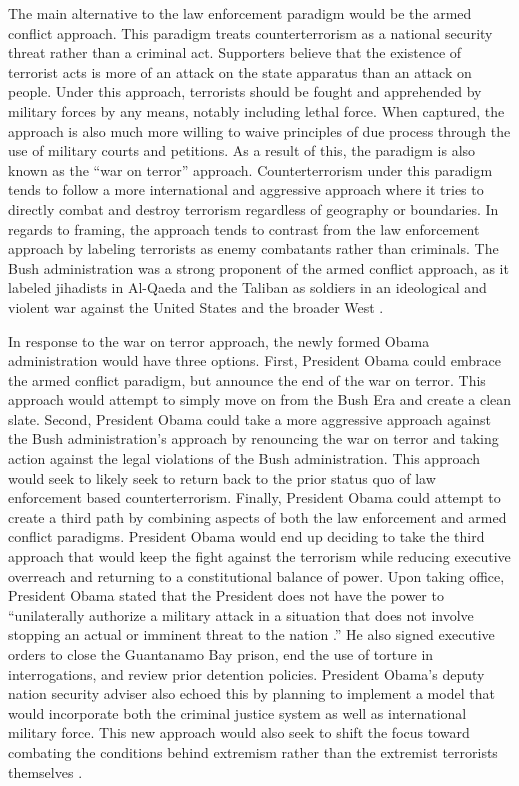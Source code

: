 \documentclass[12pt]{article}
\begin{document}
The main alternative to the law enforcement paradigm would be the armed conflict approach.
This paradigm treats counterterrorism as a national security threat rather than a criminal act.
Supporters believe that the existence of terrorist acts is more of an attack on the state apparatus than an attack on people.
Under this approach, terrorists should be fought and apprehended by military forces by any means, notably including lethal force.
When captured, the approach is also much more willing to waive principles of due process through the use of military courts and petitions.
As a result of this, the paradigm is also known as the ``war on terror'' approach.
Counterterrorism under this paradigm tends to follow a more international and aggressive approach where it tries to directly combat and destroy terrorism regardless of geography or boundaries.
In regards to framing, the approach tends to contrast from the law enforcement approach by labeling terrorists as enemy combatants rather than criminals.
The Bush administration was a strong proponent of the armed conflict approach, as it labeled jihadists in Al-Qaeda and the Taliban as soldiers in an ideological and violent war against the United States and the broader West \autocite[3]{starr-deelen2018}.

In response to the war on terror approach, the newly formed Obama administration would have three options.
First, President Obama could embrace the armed conflict paradigm, but announce the end of the war on terror.
This approach would attempt to simply move on from the Bush Era and create a clean slate.
Second, President Obama could take a more aggressive approach against the Bush administration's approach by renouncing the war on terror and taking action against the legal violations of the Bush administration.
This approach would seek to likely seek to return back to the prior status quo of law enforcement based counterterrorism.
Finally, President Obama could attempt to create a third path by combining aspects of both the law enforcement and armed conflict paradigms.
President Obama would end up deciding to take the third approach that would keep the fight against the terrorism while reducing executive overreach and returning to a constitutional balance of power.
Upon taking office, President Obama stated that the President does not have the power to ``unilaterally authorize a military attack in a situation that does not involve stopping an actual or imminent threat to the nation \autocite[6]{starr-deelen2018}.''
He also signed executive orders to close the Guantanamo Bay prison, end the use of torture in interrogations, and review prior detention policies.
President Obama's deputy nation security adviser also echoed this by planning to implement a model that would incorporate both the criminal justice system as well as international military force.
This new approach would also seek to shift the focus toward combating the conditions behind extremism rather than the extremist terrorists themselves \autocite[7]{starr-deelen2018}.
\end{document}
